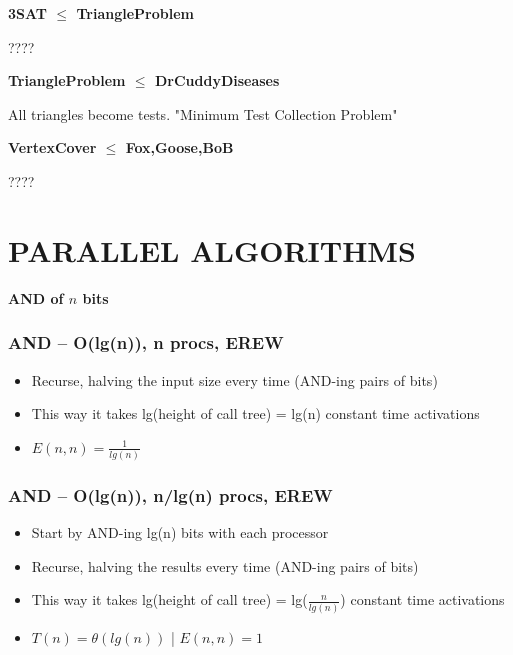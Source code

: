 \documentclass[12pt]{article}
\providecommand{\tightlist}{
    \setlength{\itemsep}{0pt}\setlength{\parskip}{0pt}
}
\providecommand{\reducible}[2]{
  \textbf{#1} $\leq$ \textbf{#2}
}
\begin{document}
\begin{centering}\textbf{\reducible{3SAT}{TriangleProblem}}\par\end{centering}
????



\begin{centering}\textbf{\reducible{TriangleProblem}{DrCuddyDiseases}}\par\end{centering}
All triangles become tests.
"Minimum Test Collection Problem"


\begin{centering}\textbf{\reducible{VertexCover}{Fox,Goose,BoB}}\par\end{centering}
????





\section{PARALLEL ALGORITHMS}
\begin{centering}\textbf{AND of $n$ bits}\par\end{centering}
\subsubsection*{AND -- O(lg(n)), n procs, EREW}
\begin{itemize}\tightlist
  \item Recurse, halving the input size every time (AND-ing pairs of bits)
  \item This way it takes lg(height of call tree) = lg(n) constant time activations
  \item $E(n,n) = \frac{1}{lg(n)}$
\end{itemize}
\subsubsection*{AND -- O(lg(n)), n/lg(n) procs, EREW}
\begin{itemize}\tightlist
  \item Start by AND-ing lg(n) bits with each processor
  \item Recurse, halving the results every time (AND-ing pairs of bits)
  \item This way it takes lg(height of call tree) = lg($\frac{n}{lg(n)}$) constant time activations
  \item $T(n) = \theta(lg(n))$ | $E(n,n) = 1$
\end{itemize}\tightlist
\end{document}
